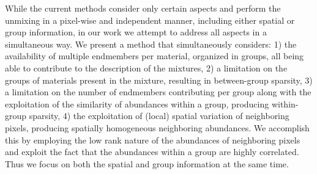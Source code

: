 \documentclass{article}
\begin{document}
While the current methods consider only certain aspects and perform the unmixing in a pixel-wise and independent manner, including either spatial or group information, in our work we attempt to address all aspects in a simultaneous way. We present a method that simultaneously considers: 1) the availability of multiple endmembers per material, organized in groups, all being able to contribute to the description of the mixtures, 2) a limitation on the groups of materials present in the mixture, resulting in between-group sparsity, 3) a limitation on the number of endmembers contributing per group along with the exploitation of the similarity of abundances within a group, producing within-group sparsity, 4) the exploitation of (local) spatial variation of neighboring pixels, producing spatially homogeneous neighboring abundances.
We accomplish this by employing the low rank nature of the abundances of neighboring pixels 
and exploit the fact that the abundances within a group are highly correlated. 
Thus we focus on both the spatial and group information at the same time.
\end{document}
